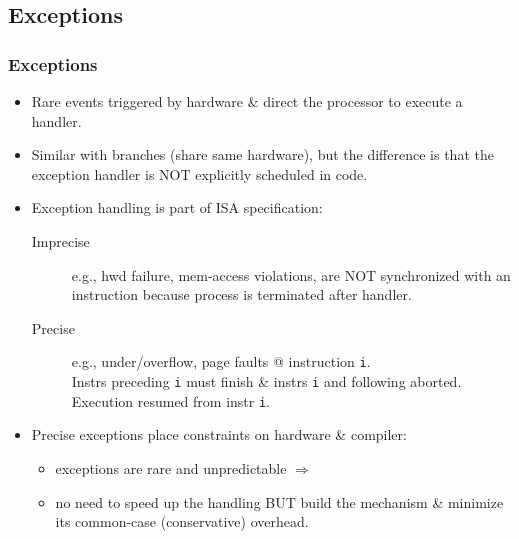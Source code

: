 \documentclass{beamer}
\newcommand{\emp}[1]{\textcolor{DikuRed}{ #1}}
\begin{document}
\subsection{Exceptions}

\begin{frame}[fragile,t]
\frametitle{Exceptions}

\begin{itemize}
\item \emp{Rare events} triggered by hardware \& direct the processor
            to execute a handler.\smallskip

\item Similar with branches (share same hardware), but the difference is that 
            the  exception handler is NOT explicitly scheduled in code.\smallskip

\item Exception handling is part of ISA specification:
    \begin{description}
        \item[Imprecise] e.g., hwd failure, mem-access violations, are
                NOT synchronized with an instruction because process is terminated
                after handler.    

        \item[Precise] e.g., under/overflow, page faults @ instruction {\tt i}.\\
            Instrs preceding {\tt i} must finish \& instrs {\tt i} and following
            aborted. Execution resumed from instr {\tt i}.
    \end  {description}\smallskip

\item \emp{Precise exceptions} place constraints on hardware \& compiler:
    \begin{itemize}
        \item exceptions are rare and unpredictable $\Rightarrow$
        \item no need to speed up the handling BUT build the mechanism \& minimize 
                its common-case (conservative) overhead.
    \end  {itemize}
\end{itemize}


\end{frame}
\end{document}
